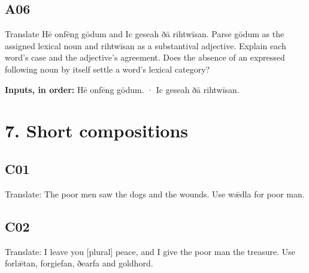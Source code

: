 \par\begin{minipage}{\linewidth}\raggedright
\subsection*{A06}

Translate Hē onfēng gōdum and Ic geseah ðā rihtwīsan. Parse gōdum as the assigned lexical noun and rihtwīsan as a substantival adjective. Explain each word’s case and the adjective’s agreement. Does the absence of an expressed following noun by itself settle a word’s lexical category?

\textbf{Inputs, in order:} Hē onfēng gōdum. · Ic geseah ðā rihtwīsan.

\end{minipage}\par\addvspace{4pt}

\section*{7. Short compositions}

\par\begin{minipage}{\linewidth}\raggedright
\subsection*{C01}

Translate: The poor men saw the dogs and the wounds. Use wǣdla for poor man.

\end{minipage}\par\addvspace{4pt}

\par\begin{minipage}{\linewidth}\raggedright
\subsection*{C02}

Translate: I leave you [plural] peace, and I give the poor man the treasure. Use forlǣtan, forgiefan, ðearfa and goldhord.

\end{minipage}\par\addvspace{4pt}

